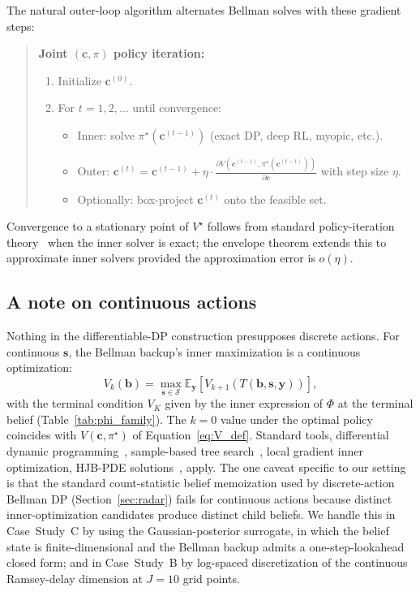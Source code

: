 \documentclass[11pt,a4paper,onecolumn]{article}
\newcommand{\E}{\mathbb{E}}
\newcommand{\bb}{\bm{b}}
\newcommand{\bc}{\bm{c}}
\newcommand{\bs}{\bm{s}}
\newcommand{\by}{\bm{y}}
\begin{document}
The natural outer-loop algorithm alternates Bellman solves with these gradient steps:
\begin{quote}
\noindent \textbf{Joint $(\bc, \pi)$ policy iteration:}
\begin{enumerate}[nosep, leftmargin=2em]
\item[1.] Initialize $\bc^{(0)}$.
\item[2.] For $t = 1, 2, \ldots$ until convergence:
  \begin{itemize}[nosep]
  \item Inner: solve $\pi^\star(\bc^{(t-1)})$ (exact DP, deep RL, myopic, etc.).
  \item Outer: $\bc^{(t)} = \bc^{(t-1)} + \eta \cdot \frac{\partial V(\bc^{(t-1)}, \pi^\star(\bc^{(t-1)}))}{\partial \bc}$ with step size $\eta$.
  \item Optionally: box-project $\bc^{(t)}$ onto the feasible set.
  \end{itemize}
\end{enumerate}
\end{quote}
Convergence to a stationary point of $V^\star$ follows from standard policy-iteration theory~\cite{puterman2014markov, bertsekas1996neuro} when the inner solver is exact; the envelope theorem extends this to approximate inner solvers provided the approximation error is $o(\eta)$.

\subsection{A note on continuous actions}

Nothing in the differentiable-DP construction presupposes discrete actions.  For continuous $\bs$, the Bellman backup's inner maximization is a continuous optimization:
\begin{equation}
V_k(\bb) = \max_{\bs \in \mathcal{S}} \E_{\by}[V_{k+1}(T(\bb, \bs, \by))],
\end{equation}
with the terminal condition $V_K$ given by the inner expression of $\Phi$ at the terminal belief (Table~\ref{tab:phi_family}).  The $k=0$ value under the optimal policy coincides with $V(\bc, \pi^\star)$ of Equation~\eqref{eq:V_def}.
Standard tools, differential dynamic programming~\cite{jacobson1970ddp, tassa2012ddp}, sample-based tree search~\cite{silver2010monte, couetoux2011continuous}, local gradient inner optimization, HJB-PDE solutions~\cite{munos2014bandits}, apply.  The one caveat specific to our setting is that the standard count-statistic belief memoization used by discrete-action Bellman DP (Section~\ref{sec:radar}) fails for continuous actions because distinct inner-optimization candidates produce distinct child beliefs.  We handle this in Case~Study~C by using the Gaussian-posterior surrogate, in which the belief state is finite-dimensional and the Bellman backup admits a one-step-lookahead closed form; and in Case~Study~B by log-spaced discretization of the continuous Ramsey-delay dimension at $J = 10$ grid points.
\end{document}
